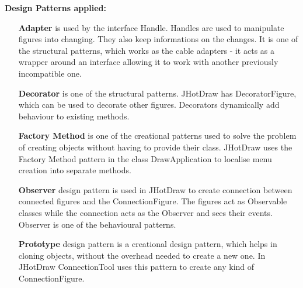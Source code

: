 \textbf{Design Patterns applied:}

\begin{enumerate}
		\item[\textbf{Adapter}] is used by the interface Handle. Handles are used to manipulate figures into changing. They also keep informations on the changes. It is one of the structural patterns, which works as the cable adapters - it acts as a wrapper around an interface allowing it to work with another previously incompatible one.
		\item[\textbf{Decorator}] is one of the structural patterns. JHotDraw has DecoratorFigure, which can be used to decorate other figures. Decorators dynamically add behaviour to existing methods.
		\item[\textbf{Factory Method}] is one of the creational patterns used to solve the problem of creating objects without having to provide their class. JHotDraw uses the Factory Method pattern in the class DrawApplication to localise menu creation into separate methods.
		\item[\textbf{Observer}] design pattern is used in JHotDraw to create connection between connected figures and the ConnectionFigure. The figures act as Observable classes while the connection acts as the Observer and sees their events. Observer is one of the behavioural patterns.
		\item[\textbf{Prototype}] design pattern is a creational design pattern, which helps in cloning objects, without the overhead needed to create a new one. In JHotDraw ConnectionTool uses this pattern to create any kind of ConnectionFigure.
	\end{enumerate}